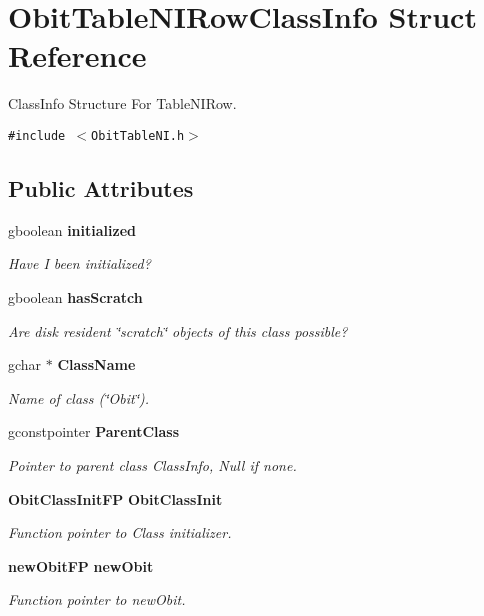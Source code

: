 \section{Obit\-Table\-NIRow\-Class\-Info Struct Reference}
\label{structObitTableNIRowClassInfo}
Class\-Info Structure For Table\-NIRow.  


{\tt \#include $<$Obit\-Table\-NI.h$>$}

\subsection*{Public Attributes}
\begin{CompactItemize}
\item 
gboolean {\bf initialized}
\begin{CompactList}\small\item\em Have I been initialized? \item\end{CompactList}\item 
gboolean {\bf has\-Scratch}
\begin{CompactList}\small\item\em Are disk resident \char`\"{}scratch\char`\"{} objects of this class possible? \item\end{CompactList}\item 
gchar $\ast$ {\bf Class\-Name}
\begin{CompactList}\small\item\em Name of class (\char`\"{}Obit\char`\"{}). \item\end{CompactList}\item 
gconstpointer {\bf Parent\-Class}
\begin{CompactList}\small\item\em Pointer to parent class Class\-Info, Null if none. \item\end{CompactList}\item 
{\bf Obit\-Class\-Init\-FP} {\bf Obit\-Class\-Init}
\begin{CompactList}\small\item\em Function pointer to Class initializer. \item\end{CompactList}\item 
{\bf new\-Obit\-FP} {\bf new\-Obit}
\begin{CompactList}\small\item\em Function pointer to new\-Obit. \item\end{CompactList}\item 

\end{CompactItemize}
